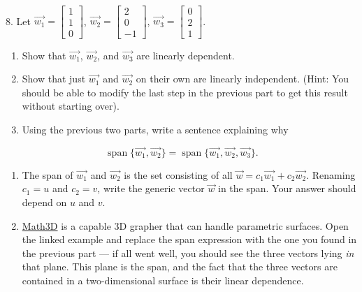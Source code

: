 \documentclass{article}
\begin{document}
~\\

8. Let $\vec{w_1} = \left[\begin{array}{c} 1 \\ 1 \\ 0 \end{array}\right]$, $\vec{w_2} = \left[\begin{array}{c} 2 \\ 0 \\ -1 \end{array}\right]$, $\vec{w_3} = \left[\begin{array}{c} 0 \\ 2 \\ 1 \end{array}\right]$.

\begin{enumerate}

	\item Show that $\vec{w_1}$, $\vec{w_2}$, and $\vec{w_3}$ are linearly dependent.

	\item Show that just $\vec{w_1}$ and $\vec{w_2}$ on their own are linearly independent. (Hint: You should be able to modify the last step in the previous part to get this result without starting over).

	\item Using the previous two parts, write a sentence explaining why

\end{enumerate}

$$
	\operatorname{span}\{\vec{w_1}, \vec{w_2}\} = \operatorname{span}\{\vec{w_1}, \vec{w_2}, \vec{w_3}\}.
$$

\begin{enumerate}

	\item The span of $\vec{w_1}$ and $\vec{w_2}$ is the set consisting of all $\vec{w} = c_1\vec{w_1} + c_2\vec{w_2}$. Renaming $c_1 = u$ and $c_2 = v$, write the generic vector $\vec{w}$ in the span. Your answer should depend on $u$ and $v$.

	\item \href{https://www.math3d.org/8Adpukc7b}{Math3D} is a capable 3D grapher that can handle parametric surfaces. Open the linked example and replace the span expression with the one you found in the previous part --- if all went well, you should see the three vectors lying \textit{in} that plane. This plane is the span, and the fact that the three vectors are contained in a two-dimensional surface is their linear dependence.

\end{enumerate}
\end{document}
